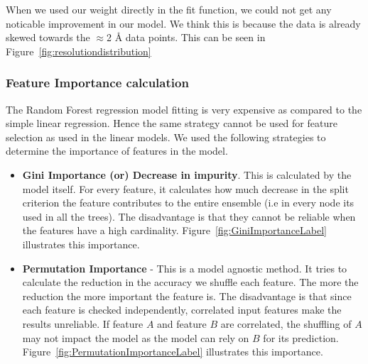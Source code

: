 \documentclass[11pt]{article}
\begin{document}
When we used our weight directly in the fit function,  we could not get any noticable improvement in our model.
We think this is because the data is already skewed towards the $\approx$2 \si{\angstrom}
data points.
This can be seen in Figure~\ref{fig:resolutiondistribution}

\subsubsection{Feature Importance calculation}
The Random Forest regression model fitting is very expensive as compared to the simple linear regression.
Hence the same strategy cannot be used for feature selection as used in the linear models.
We used the following strategies to determine the importance of features in the model.

\begin{itemize}
\item \textbf{Gini Importance (or) Decrease in impurity}.  This is calculated by the model itself.
For every feature,  it calculates how much decrease in the split criterion the feature contributes to the entire ensemble (i.e in every node its used in all the trees).
The disadvantage is that they cannot be reliable when the features have a high cardinality.  Figure~\ref{fig:GiniImportanceLabel} illustrates this importance.
\item \textbf{Permutation Importance} - This is a model agnostic method.
It tries to calculate the reduction in the accuracy we shuffle each feature.
The more the reduction the more important the feature is.
The disadvantage is that since each feature is checked independently,  correlated input features make the results unreliable. 
If feature $A$ and feature $B$ are correlated,  the shuffling of $A$ may not impact the model as the model can rely on $B$ for its prediction.  Figure~\ref{fig:PermutationImportanceLabel} illustrates this importance.
\end{itemize}
\end{document}
